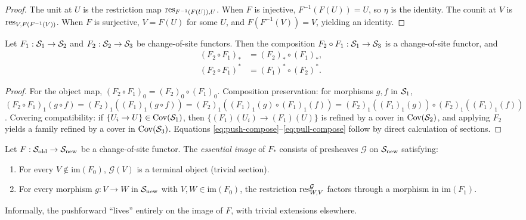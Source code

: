 \documentclass[11pt]{article}
\newcommand{\SiteOld}{\Site_{\mathrm{old}}}
\newcommand{\SiteNew}{\Site_{\mathrm{new}}}
\newcommand{\FunctorF}{F}
\newcommand{\Pushforward}{F_*}
\begin{document}
\begin{proof}
The unit at $U$ is the restriction map
$\res_{\FunctorF^{-1}(\FunctorF(U)), U}$.  When $\FunctorF$ is injective,
$\FunctorF^{-1}(\FunctorF(U)) = U$, so $\eta$ is the identity.  The
counit at $V$ is $\res_{V, \FunctorF(\FunctorF^{-1}(V))}$.  When
$\FunctorF$ is surjective, $V = \FunctorF(U)$ for some $U$, and
$\FunctorF(\FunctorF^{-1}(V)) = V$, yielding an identity.
\end{proof}

\begin{theorem}\label{thm:composition}
Let $\FunctorF_1 : \Site_1 \to \Site_2$ and $\FunctorF_2 : \Site_2 \to
\Site_3$ be change-of-site functors.  Then the composition
$\FunctorF_2 \circ \FunctorF_1 : \Site_1 \to \Site_3$ is a change-of-site
functor, and
\begin{align}
  (\FunctorF_2 \circ \FunctorF_1)_* &= (\FunctorF_2)_* \circ (\FunctorF_1)_*, \label{eq:push-compose}\\
  (\FunctorF_2 \circ \FunctorF_1)^* &= (\FunctorF_1)^* \circ (\FunctorF_2)^*. \label{eq:pull-compose}
\end{align}
\end{theorem}

\begin{proof}
For the object map, $(\FunctorF_2 \circ \FunctorF_1)_0 = (\FunctorF_2)_0
\circ (\FunctorF_1)_0$.  Composition preservation: for morphisms $g, f$ in
$\mathcal{S}_1$, $(\FunctorF_2 \circ \FunctorF_1)_1(g \circ f) =
(\FunctorF_2)_1((\FunctorF_1)_1(g \circ f)) =
(\FunctorF_2)_1((\FunctorF_1)_1(g) \circ (\FunctorF_1)_1(f)) =
(\FunctorF_2)_1((\FunctorF_1)_1(g)) \circ
(\FunctorF_2)_1((\FunctorF_1)_1(f))$.  Covering compatibility: if
$\{U_i \to U\} \in \mathrm{Cov}(\mathcal{S}_1)$, then $\{(\FunctorF_1)(U_i) \to
(\FunctorF_1)(U)\}$ is refined by a cover in $\mathrm{Cov}(\mathcal{S}_2)$, and applying
$\FunctorF_2$ yields a family refined by a cover in $\mathrm{Cov}(\mathcal{S}_3)$.
Equations \eqref{eq:push-compose}--\eqref{eq:pull-compose} follow by
direct calculation of sections.
\end{proof}

\begin{proposition}\label{prop:image-char}
Let $\FunctorF : \SiteOld \to \SiteNew$ be a change-of-site functor.  The
\emph{essential image} of $\Pushforward$ consists of presheaves
$\mathcal{G}$ on $\SiteNew$ satisfying:
\begin{enumerate}[noitemsep]
  \item For every $V \notin \mathrm{im}(\FunctorF_0)$, $\mathcal{G}(V)$
        is a terminal object (trivial section).
  \item For every morphism $g : V \to W$ in $\SiteNew$ with
        $V, W \in \mathrm{im}(\FunctorF_0)$, the restriction
        $\mathrm{res}_{W,V}^{\mathcal{G}}$ factors through a morphism in
        $\mathrm{im}(\FunctorF_1)$.
\end{enumerate}
Informally, the pushforward ``lives'' entirely on the image of $\FunctorF$,
with trivial extensions elsewhere.
\end{proposition}
\end{document}
